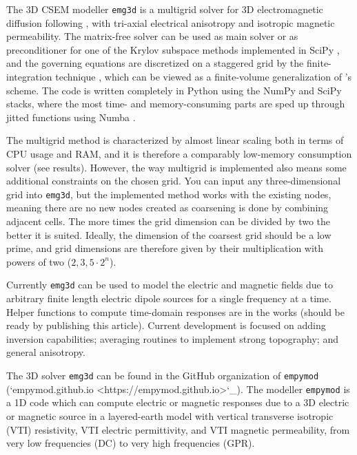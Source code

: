 \documentclass[
    paper,
  ]{geophysics}
\newcommand{\emg}[2]{\texttt{emg#1#2}\xspace}
\newcommand{\empymod}{\texttt{empymod}\xspace}
\begin{document}
The 3D CSEM modeller \emg3d \citep{JOSS.19.Werthmuller} is a multigrid
\citep{CMMP.64.Fedorenko} solver for 3D electromagnetic diffusion following
\cite{GP.06.Mulder}, with tri-axial electrical anisotropy and isotropic
magnetic permeability. The matrix-free solver can be used as main solver or as
preconditioner for one of the Krylov subspace methods implemented in SciPy
\citep{NM.20.Virtanen}, and the governing equations are discretized on a
staggered grid by the finite-integration technique \cite{AEU.77.Weiland}, which
can be viewed as a finite-volume generalization of \cite{IEEE.66.Yee}'s scheme.
The code is written completely in Python using the NumPy
\citep{CSE.11.VanDerWalt} and SciPy stacks, where the most time- and
memory-consuming parts are sped up through jitted functions using Numba
\citep{LLVM.15.Lam}.

The multigrid method is characterized by almost linear scaling both in terms
of CPU usage and RAM, and it is therefore a comparably low-memory consumption
solver (see results). However, the way multigrid is implemented also means some
additional constraints on the chosen grid. You can input any three-dimensional
grid into \emg3d, but the implemented method works with the existing nodes,
meaning there are no new nodes created as coarsening is done by combining
adjacent cells. The more times the grid dimension can be divided by two the
better it is suited. Ideally, the dimension of the coarsest grid should be a
low prime, and grid dimensions are therefore given by their multiplication with
powers of two (${2,3,5}·2^n$).

Currently \emg3d can be used to model the electric and magnetic fields due to
arbitrary finite length electric dipole sources for a single frequency at a
time. Helper functions to compute time-domain responses are in the works
(should be ready by publishing this article). Current development is focused
on adding inversion capabilities; averaging routines to implement strong
topography; and general anisotropy.

The 3D solver \emg3d can be found in the GitHub organization of \empymod
(`empymod.github.io <https://empymod.github.io>`_). The modeller \empymod
\citep{GEO.17.Werthmuller} is a 1D code which can compute electric or
magnetic responses due to a 3D electric or magnetic source in a layered-earth
model with vertical transverse isotropic (VTI) resistivity, VTI electric
permittivity, and VTI magnetic permeability, from very low frequencies (DC) to
very high frequencies (GPR).
\end{document}
